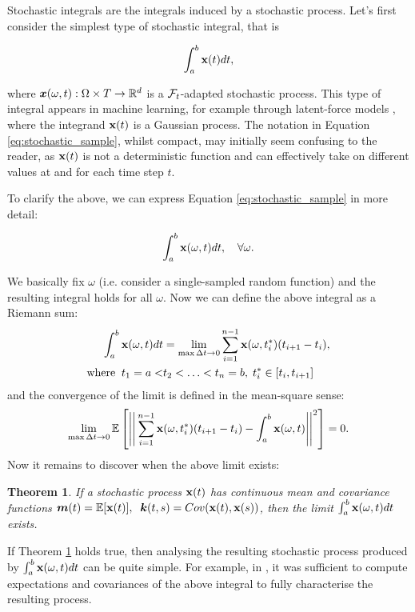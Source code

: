 \documentclass[a4paper,12pt,twoside,openright]{report}
\newtheorem{theorem}{Theorem}
\theoremstyle{definition}
\begin{document}
Stochastic integrals are the integrals induced by a stochastic process. Let's first consider the simplest type of stochastic integral, that is

\begin{align} \label{eq:stochastic_sample}
    \int_{a}^{b} {\mathbf{x}}(t) dt,
\end{align}

where ${\bm{x}}(\omega, t): \Omega \times T \rightarrow {\mathbb{R}}^d$ is a ${\mathcal{F}}_t$-adapted stochastic process. This type of integral appears in machine learning, for example through latent-force models \citep{alvarez2009latent,alvarez2013linear}, where the integrand ${\mathbf{x}}(t)$ is a Gaussian process. The notation in Equation \ref{eq:stochastic_sample}, whilst compact, may initially seem confusing to the reader, as ${\mathbf{x}}(t)$ is not a deterministic function and can effectively take on different values at and for each time step $t$.

To clarify the above, we can express  Equation \ref{eq:stochastic_sample} in more detail:

\begin{align*}
    \int_{a}^{b} {\mathbf{x}}(\omega, t) dt, \quad \forall \omega.
\end{align*}

We basically fix $\omega$ (i.e. consider a single-sampled random function) and the resulting integral holds for all $\omega$.  Now we can define the above integral as a Riemann sum:
\begin{align*}
    \int_{a}^{b} {\mathbf{x}}(\omega, t) dt &= \lim_{ \max \Delta t \rightarrow 0} \sum_{i=1}^{n-1} {\mathbf{x}}(\omega, t_i^{*}) (t_{i+1} - t_i), \\
    \text{where} \;\; t_1 = a < &t_2 < \hdots < t_n = b, \;  t_i^{*} \in [ t_i, t_{i+1}]
\end{align*}
and the convergence of the limit is defined in the mean-square sense:
\begin{align*}
    \lim_{\max \Delta t \rightarrow 0} \mathbb{E} \left[ \Bigg|\Bigg|\sum_{i=1}^{n-1} {\mathbf{x}}(\omega, t_i^{*}) (t_{i+1} - t_i)-  \int_{a}^{b} {\mathbf{x}}(\omega, t) \Bigg|\Bigg|^2\right] =  0.
\end{align*}
Now it remains to discover when the above limit exists:
\begin{theorem}\label{thrm:ito_simple}
  If a stochastic process ${\mathbf{x}}(t)$ has continuous mean and covariance functions ${\bm{m}}(t) = \mathbb{E}[{\mathbf{x}}(t)],\;\; {\bm{k}}(t, s) = Cov({\mathbf{x}}(t), {\mathbf{x}}(s))$, then the limit $\int_{a}^{b} {\mathbf{x}}(\omega, t) dt$ exists.
\end{theorem}
If Theorem \ref{thrm:ito_simple} holds true, then analysing the resulting stochastic process produced by $\int_{a}^{b} {\mathbf{x}}(\omega, t) dt$ can be quite simple. For example, in \cite{alvarez2009latent}, it was sufficient to compute expectations and covariances of the above integral to fully characterise the resulting process.
 
\end{document}
